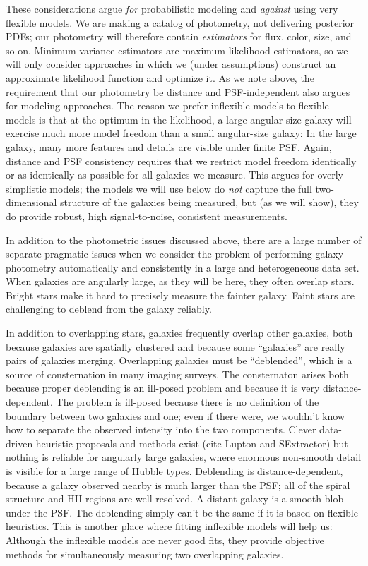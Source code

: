 \documentclass[12pt,preprint,pdftex]{aastex}
\begin{document}
These considerations argue \emph{for} probabilistic modeling and
\emph{against} using very flexible models.  We are making a catalog of
photometry, not delivering posterior PDFs; our photometry will
therefore contain \emph{estimators} for flux, color, size, and so-on.
Minimum variance estimators are maximum-likelihood estimators, so we
will only consider approaches in which we (under assumptions)
construct an approximate likelihood function and optimize it.  As we
note above, the requirement that our photometry be distance and
PSF-independent also argues for modeling approaches.  The reason we
prefer inflexible models to flexible models is that at the optimum in
the likelihood, a large angular-size galaxy will exercise much more
model freedom than a small angular-size galaxy: In the large galaxy,
many more features and details are visible under finite PSF.  Again,
distance and PSF consistency requires that we restrict model freedom
identically or as identically as possible for all galaxies we measure.
This argues for overly simplistic models; the models we will use below
do \emph{not} capture the full two-dimensional structure of the
galaxies being measured, but (as we will show), they do provide
robust, high signal-to-noise, consistent measurements.

In addition to the photometric issues discussed above, there are a
large number of separate pragmatic issues when we consider the problem
of performing galaxy photometry automatically and consistently in a
large and heterogeneous data set.  When galaxies are angularly large,
as they will be here, they often overlap stars.  Bright stars make it
hard to precisely measure the fainter galaxy.  Faint stars are
challenging to deblend from the galaxy reliably.

In addition to overlapping stars, galaxies frequently overlap other
galaxies, both because galaxies are spatially clustered and because
some ``galaxies'' are really pairs of galaxies merging.  Overlapping
galaxies must be ``deblended'', which is a source of consternation in
many imaging surveys.  The consternaton arises both because proper
deblending is an ill-posed problem and because it is very
distance-dependent.  The problem is ill-posed because there is no
definition of the boundary between two galaxies and one; even if there
were, we wouldn't know how to separate the observed intensity into the
two components.  Clever data-driven heuristic proposals and methods
exist (cite Lupton and SExtractor) but nothing is reliable for
angularly large galaxies, where enormous non-smooth detail is visible
for a large range of Hubble types.  Deblending is distance-dependent,
because a galaxy observed nearby is much larger than the PSF; all of
the spiral structure and HII regions are well resolved.  A distant
galaxy is a smooth blob under the PSF.  The deblending simply can't be
the same if it is based on flexible heuristics.  This is another place
where fitting inflexible models will help us: Although the inflexible
models are never good fits, they provide objective methods for
simultaneously measuring two overlapping galaxies.
\end{document}
